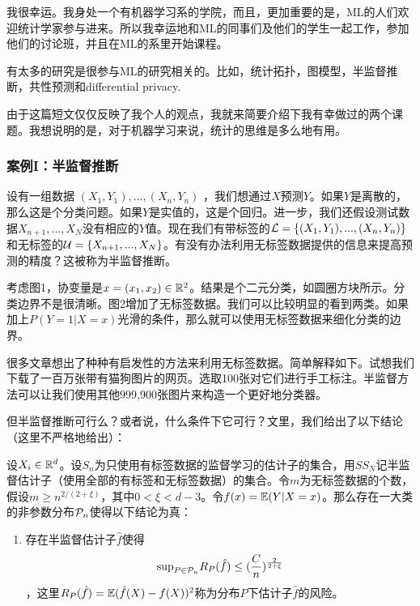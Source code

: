 \documentclass[]{article}
\begin{document}
我很幸运。我身处一个有机器学习系的学院，而且，更加重要的是，ML的人们欢迎统计学家参与进来。所以我幸运地和ML的同事们及他们的学生一起工作，参加他们的讨论班，并且在ML的系里开始课程。

有太多的研究是很参与ML的研究相关的。比如，统计拓扑，图模型，半监督推断，共性预测和differential privacy.

由于这篇短文仅仅反映了我个人的观点，我就来简要介绍下我有幸做过的两个课题。我想说明的是，对于机器学习来说，统计的思维是多么地有用。

\subsubsection{案例I：半监督推断}

设有一组数据 $(X_1,Y_1),...,(X_n,Y_n)$ ，我们想通过$X$预测$Y$。如果$Y$是离散的，那么这是个分类问题。如果$Y$是实值的，这是个回归。进一步，我们还假设测试数据$X_{n+1},...,X_N$没有相应的$Y$值。现在我们有带标签的${\mathcal{L}}=\{(X_1,Y_1),...,(X_n,Y_n)\}$和无标签的${\mathcal{U}}=\{X_{n+1},...,X_N\}$。有没有办法利用无标签数据提供的信息来提高预测的精度？这被称为半监督推断。

考虑图1，协变量是$x=(x_1,x_2) \in {\mathbb{R}}^2$。结果是个二元分类，如圆圈方块所示。分类边界不是很清晰。图2增加了无标签数据。我们可以比较明显的看到两类。如果加上$P(Y=1\vert X=x)$光滑的条件，那么就可以使用无标签数据来细化分类的边界。

很多文章想出了种种有启发性的方法来利用无标签数据。简单解释如下。试想我们下载了一百万张带有猫狗图片的网页。选取100张对它们进行手工标注。半监督方法可以让我们使用其他999,900张图片来构造一个更好地分类器。

但半监督推断可行么？或者说，什么条件下它可行？文\cite{}里，我们给出了以下结论（这里不严格地给出）：

设$X_i \in {\mathbb{R}}^d$。设$S_n$为只使用有标签数据的监督学习的估计子的集合，用$SS_N$记半监督估计子（使用全部的有标签和无标签数据）的集合。令$m$为无标签数据的个数，假设$m\geq n^{2/(2+\xi)}$，其中$0 < \xi < d-3$。令$f(x)={\mathbb{E}}(Y\vert X=x)$。那么存在一大类的非参数分布${\mathcal{P}}_n$使得以下结论为真：

\begin{enumerate}
\def\labelenumi{\arabic{enumi}.}
\itemsep1pt\parskip0pt
\item 存在半监督估计子$\hat{f}$使得
    $$ \mathrm{sup}_{P \in {\mathcal{P}}_n} R_P(\hat{f}) \leq (\frac{C}{n})^\frac{2}{2+\xi}$$，这里$R_P(\hat{f})={\mathbb{E}}(\hat{f}(X) - f(X))^2$称为分布$P$下估计子$\hat{f}$的风险。
\end{enumerate}
\end{document}
